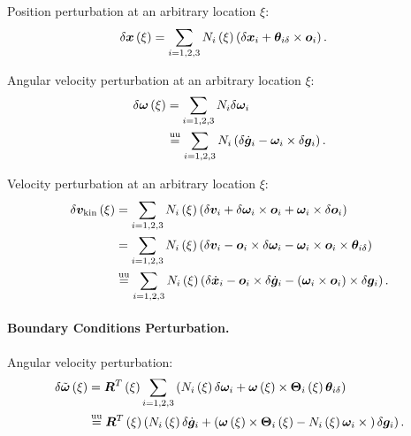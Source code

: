 Position perturbation at an arbitrary location $\xi$:
\begin{align}
	\delta\bm{x}\left( \xi \right)
	&=
	\sum_{i=1,2,3} N_i\left( \xi \right) \left( 
		\delta\bm{x}_i + \bm{\theta}_{i\delta}\times\bm{o}_i
	 \right)
	.
\end{align}

Angular velocity perturbation at an arbitrary location $\xi$:
\begin{align}
	\delta\bm{\omega}\left( \xi \right)
	&=
	\sum_{i=1,2,3} N_i \delta\bm{\omega}_i
	\nonumber \\
	&\overset{\text{uu}}{=}
	\sum_{i=1,2,3} N_i \left( 
		\delta\dot{\bm{g}}_i
		- \bm{\omega}_i \times \delta\bm{g}_i
	 \right)
	.
\end{align}

Velocity perturbation at an arbitrary location $\xi$:
\begin{align}
	\delta\bm{v}_{\text{kin}}\left( \xi \right)
	&=
	\sum_{i=1,2,3} N_i\left( \xi \right) \left( 
		\delta\bm{v}_i
		+ \delta\bm{\omega}_i \times \bm{o}_i
		+ \bm{\omega}_i \times \delta\bm{o}_i
	 \right)
	\nonumber \\
	&= 
	\sum_{i=1,2,3} N_i\left( \xi \right) \left( 
		\delta\bm{v}_i
		- \bm{o}_i \times \delta\bm{\omega}_i
		- \bm{\omega}_i \times \bm{o}_i \times \bm{\theta}_{i\delta}
	 \right)
	\nonumber \\
	&\overset{\text{uu}}{=}
	\sum_{i=1,2,3} N_i\left( \xi \right) \left( 
		\delta\dot{\bm{x}}_i
		- \bm{o}_i \times \delta\dot{\bm{g}}_i
		- \left( \bm{\omega}_i \times \bm{o}_i \right) \times \delta\bm{g}_i
	 \right)
	.
\end{align}


\paragraph{Boundary Conditions Perturbation.}
Angular velocity perturbation:
\begin{align}
	\delta\tilde{\bm{\omega}}\left( \xi \right)
	&= \bm{R}^T\left( \xi \right) \sum_{i=1,2,3}\left( 
		N_i\left( \xi \right) \delta\bm{\omega}_i
		+ \bm{\omega}\left( \xi \right) \times \bm{\Theta}_i\left( \xi \right) \bm{\theta}_{i\delta}
	 \right)
	\nonumber \\
	&\overset{\text{uu}}{=}
	\bm{R}^T\left( \xi \right) \left( 
		N_i\left( \xi \right) \delta\dot{\bm{g}}_i
		+ \left( 
			\bm{\omega}\left( \xi \right) \times \bm{\Theta}_i\left( \xi \right)
			- N_i\left( \xi \right) \bm{\omega}_i \times{}
		 \right) \delta\bm{g}_i
	 \right)
	.
\end{align}

